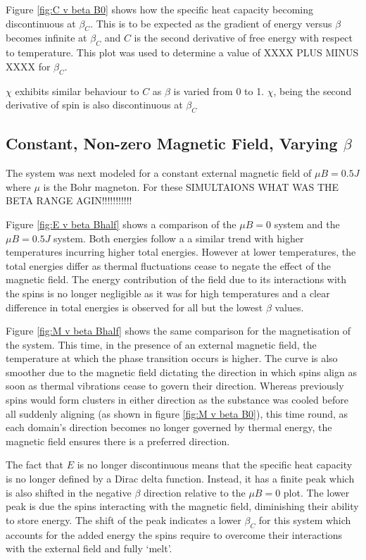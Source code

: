\documentclass[11pt]{article}   	%
\begin{document}
Figure \ref{fig:C v beta B0} shows how the specific heat capacity becoming discontinuous at $\beta_C$. This is to be expected as the gradient of energy versus $\beta$ becomes infinite at $\beta_C$ and $C$ is the second derivative of free energy with respect to temperature. This plot was used to determine a value of XXXX PLUS MINUS XXXX for $\beta_C$. %

$\chi$ exhibits similar behaviour to $C$ as $\beta$ is varied from 0 to 1. $\chi$, being the second derivative of spin is also discontinuous at $\beta_C$
%
%
\subsection{Constant, Non-zero Magnetic Field, Varying $\beta$}
The system was next modeled for a constant external magnetic field of $\mu B = 0.5J$ where $\mu$ is the Bohr magneton. For these SIMULTAIONS WHAT WAS THE BETA RANGE AGIN!!!!!!!!!!!

Figure \ref{fig:E v beta Bhalf} shows a comparison of the $\mu B=0$ system and the $\mu B = 0.5J$ system. Both energies follow a a similar trend with higher temperatures incurring higher total energies. However at lower temperatures, the total energies differ as thermal fluctuations cease to negate the effect of the magnetic field. The energy contribution of the field due to its interactions with the spins is no longer negligible as it was for high temperatures and a clear difference in total energies is observed for all but the lowest $\beta$ values.

Figure \ref{fig:M v beta Bhalf} shows the same comparison for the magnetisation of the system. This time, in the presence of an external magnetic field, the temperature at which the phase transition occurs is higher. The curve is also smoother due to the magnetic field dictating the direction in which spins align as soon as thermal vibrations cease to govern their direction. Whereas previously spins would form clusters in either direction as the substance was cooled before all suddenly aligning (as shown in figure \ref{fig:M v beta B0}), this time round, as each domain's direction becomes no longer governed by thermal energy, the magnetic field ensures there is a preferred direction.

The fact that $E$ is no longer discontinuous means that the specific heat capacity is no longer defined by a Dirac delta function. Instead, it has a finite peak which is also shifted in the negative $\beta$ direction relative to the $\mu B = 0$ plot. The lower peak is due the spins interacting with the magnetic field, diminishing their ability to store energy. The shift of the peak indicates a lower $\beta_C$ for this system which accounts for the added energy the spins require to overcome their interactions with the external field and fully \textquoteleft melt\textquoteright.
\end{document}
